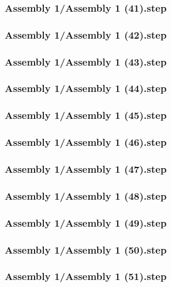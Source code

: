 \documentclass[a4paper,12pt]{article}
\begin{document}
\subsubsection{Assembly 1/Assembly 1 (41).step}

\subsubsection{Assembly 1/Assembly 1 (42).step}

\subsubsection{Assembly 1/Assembly 1 (43).step}

\subsubsection{Assembly 1/Assembly 1 (44).step}

\subsubsection{Assembly 1/Assembly 1 (45).step}

\subsubsection{Assembly 1/Assembly 1 (46).step}

\subsubsection{Assembly 1/Assembly 1 (47).step}

\subsubsection{Assembly 1/Assembly 1 (48).step}

\subsubsection{Assembly 1/Assembly 1 (49).step}

\subsubsection{Assembly 1/Assembly 1 (50).step}

\subsubsection{Assembly 1/Assembly 1 (51).step}

\end{document}
